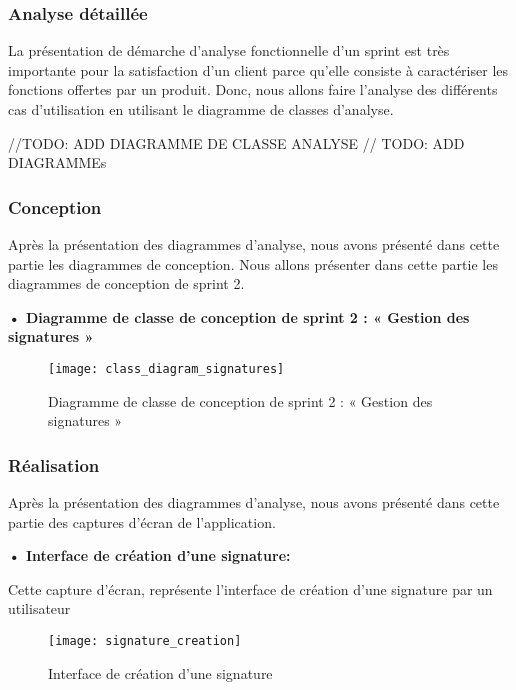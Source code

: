\subsubsection{Analyse détaillée}
La présentation de démarche d'analyse fonctionnelle d'un sprint est très importante pour la satisfaction d'un client parce qu'elle consiste à caractériser les fonctions offertes par un produit.
Donc, nous allons faire l'analyse des différents cas d'utilisation en utilisant le diagramme de classes d'analyse.

//TODO: ADD DIAGRAMME DE CLASSE ANALYSE
// TODO: ADD DIAGRAMMEs

\subsubsection{Conception}

Après la présentation des diagrammes d'analyse, nous avons présenté dans cette partie les diagrammes de conception.
Nous allons présenter dans cette partie les diagrammes de conception de sprint 2.

\textbf{•	Diagramme de classe de conception de sprint 2 : « Gestion des signatures »}

\begin{figure}[H]
  \centering
  \texttt{[image: class\_diagram\_signatures]}
  \caption{Diagramme de classe de conception de sprint 2 : « Gestion des signatures »}
  \label{fig:class_diagram_signatures}
\end{figure}

\subsubsection{Réalisation}

Après la présentation des diagrammes d'analyse, nous avons présenté dans cette partie des captures d'écran de l'application.

\textbf{•	Interface de création d'une signature:}

Cette capture d'écran, représente l'interface de création d'une signature par un utilisateur

\begin{figure}[H]
  \centering
  \texttt{[image: signature\_creation]}
  \caption{Interface de création d'une signature}
  \label{fig:signature_creation}
\end{figure}

